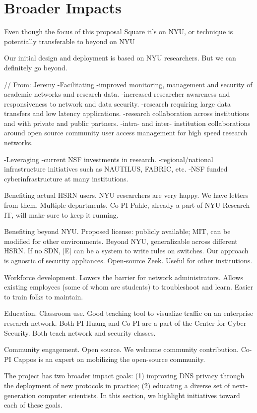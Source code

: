 \section{Broader Impacts}\label{sec:impacts}

 Even though the focus of this proposal Square it's on NYU, or technique is potentially transferable to beyond on NYU


Our initial design and deployment is based on NYU researchers. But we can definitely go beyond.

// From: Jeremy
-Facilitating
-improved monitoring, management and security of academic networks and research
data.
-increased researcher awareness and responsiveness to network and data security.
-research requiring large data transfers and low latency applications.
-research collaboration across institutions and with private and public partners.
-intra- and inter- institution collaborations around open source community user access
management for high speed research networks.

-Leveraging
-current NSF investments in research.
-regional/national infrastructure initiatives such as NAUTILUS, FABRIC, etc.
-NSF funded cyberinfrastructure at many institutions.

Benefiting actual HSRN users. NYU researchers are very happy. We have letters from them. Multiple departments. Co-PI Pahle, already a part of NYU Research IT, will make sure to keep it running.

Benefiting beyond NYU. Proposed license: publicly available; MIT, can be modified for other environments. Beyond NYU, generalizable across different HSRN. If no SDN, [E] can be a system to write rules on switches. Our approach is agnostic of security appliances. Open-source Zeek. Useful for other institutions.

Workforce development. Lowers the barrier for network administrators. Allows existing employees (some of whom are students) to troubleshoot and learn. Easier to train folks to maintain.

Education. Classroom use. Good teaching tool to visualize traffic on an enterprise research network. Both PI Huang and Co-PI are a part of the Center for Cyber Security. Both teach network and security classes.

Community engagement. Open source. We welcome community contribution. Co-PI Cappos is an expert on mobilizing the open-source community.




The project has two broader impact goals: (1) improving DNS privacy through
the deployment of new protocols in practice; (2) educating a diverse set of
next-generation computer scientists. In this section, we highlight
initiatives toward each of these goals.

